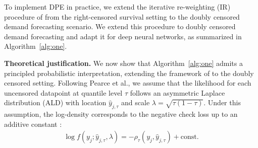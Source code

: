 \documentclass[sigconf]{acmart}
\begin{document}
\begin{algorithm}[!htbp]
\caption{Iterative Re-weighting for DPE Training}
\label{alg:one}
\end{algorithm}

To implement DPE in practice, we extend the iterative re-weighting (IR) procedure of \citet{pearce2022censored} from the right-censored survival setting to the doubly censored demand forecasting scenario. We extend this procedure to doubly censored demand forecasting and adapt it for deep neural networks, as summarized in Algorithm~\ref{alg:one}.


\textbf{Theoretical justification.} 
We now show that Algorithm~\ref{alg:one} admits a principled probabilistic interpretation, extending the framework of \citet{pearce2022censored} to the doubly censored setting. Following Pearce et al., we assume that the likelihood for each uncensored datapoint at quantile level $\tau$ follows an asymmetric Laplace distribution (ALD) with location $\hat{y}_{j,\tau}$ and scale $\lambda = \sqrt{\tau(1-\tau)}$. Under this assumption, the log-density corresponds to the negative check loss up to an additive constant \citep[Eq.~16]{pearce2022censored}:
\begin{align*}
\log f(y_j; \hat{y}_{j,\tau}, \lambda) = -\rho_\tau(y_j, \hat{y}_{j,\tau}) + \text{const}.
\end{align*}
\end{document}
